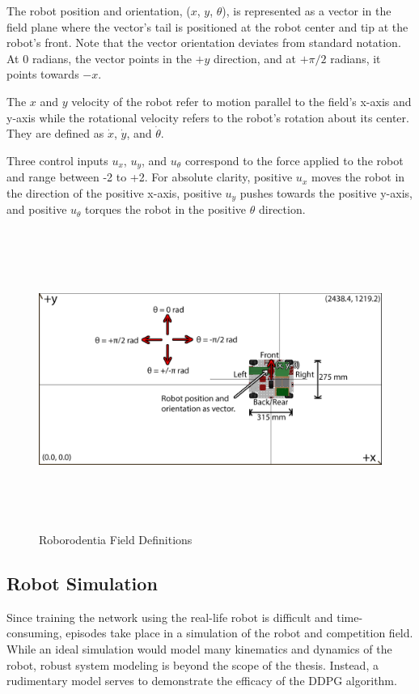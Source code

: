 The robot position and orientation, ($x$, $y$, $\theta$), is represented as a vector in the field plane where the vector's tail is positioned at the robot center and tip at the robot's front. Note that the vector orientation deviates from standard notation. At 0 radians, the vector points in the $+y$ direction, and at $+\pi/2$ radians, it points towards $-x$. 

The $x$ and $y$ velocity of the robot refer to motion parallel to the field's x-axis and y-axis while the rotational velocity refers to the robot's rotation about its center. They are defined as $\dot{x}$, $\dot{y}$, and $\dot{\theta}$. 

Three control inputs $u_x$, $u_y$, and $u_\theta$ correspond to the force applied to the robot and range between -2 to +2. For absolute clarity, positive $u_x$ moves the robot in the direction of the positive x-axis, positive $u_y$ pushes towards the positive y-axis, and positive $u_\theta$ torques the robot in the positive $\theta$ direction. 
\begin{figure}[H]
	\includegraphics[width=6in, height=3.85in, keepaspectratio]{figures/field_defs.png}
	\caption{Roborodentia Field Definitions} \label{fig:field_defs}
\end{figure}

\subsection{Robot Simulation}
Since training the network using the real-life robot is difficult and time-consuming, episodes take place in a simulation of the robot and competition field. While an ideal simulation would model many kinematics and dynamics of the robot, robust system modeling is beyond the scope of the thesis. Instead, a rudimentary model serves to demonstrate the efficacy of the DDPG algorithm. 

